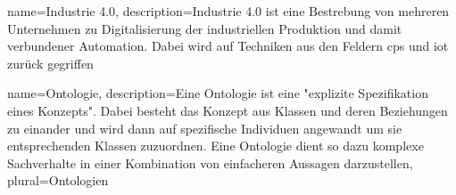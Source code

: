 {
  name={Industrie 4.0},
  description={Industrie 4.0 ist eine Bestrebung von mehreren Unternehmen zu Digitalisierung der industriellen Produktion und damit verbundener Automation. Dabei wird auf Techniken aus den Feldern \acrshort{cps} und \acrshort{iot} zurück gegriffen}
}

{
  name={Ontologie},
  description={Eine Ontologie ist eine "explizite Spezifikation eines Konzepts". \cite{guarino2009ontology} Dabei besteht das Konzept aus Klassen und deren Beziehungen zu einander und wird dann auf spezifische Individuen angewandt um sie entsprechenden Klassen zuzuordnen. Eine Ontologie dient so dazu komplexe Sachverhalte in einer Kombination von einfacheren Aussagen darzustellen},
  plural={Ontologien}
}
